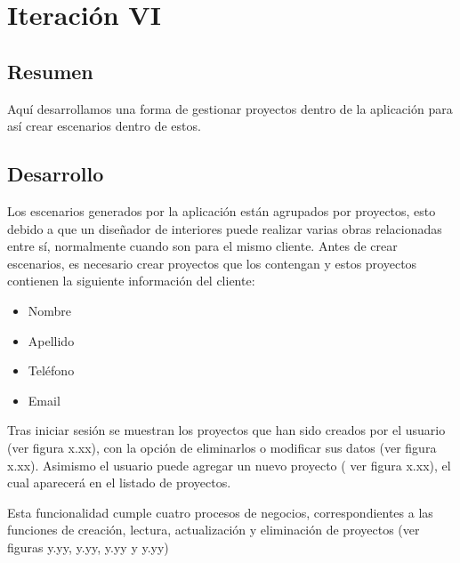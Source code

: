 \section{Iteración VI}
\subsection{Resumen}
Aquí desarrollamos una forma de gestionar proyectos dentro de la aplicación para así crear escenarios dentro de estos.

\subsection{Desarrollo}
Los escenarios generados por la aplicación están agrupados por proyectos, esto debido a que un diseñador de interiores puede realizar varias obras relacionadas entre sí, normalmente cuando son para el mismo cliente. Antes de crear escenarios, es necesario crear proyectos que los contengan y estos proyectos contienen la siguiente información del cliente:
\begin{itemize}
	\item Nombre
	\item Apellido
	\item Teléfono
	\item Email
\end{itemize}

Tras iniciar sesión se muestran los proyectos que han sido creados por el usuario (ver figura x.xx), con la opción de eliminarlos o modificar sus datos (ver figura x.xx). Asimismo el usuario puede agregar un nuevo proyecto ( ver figura x.xx), el cual aparecerá en el listado de proyectos.

Esta funcionalidad cumple cuatro procesos de negocios, correspondientes a las funciones de creación, lectura, actualización y eliminación de proyectos (ver figuras y.yy, y.yy, y.yy y y.yy)


